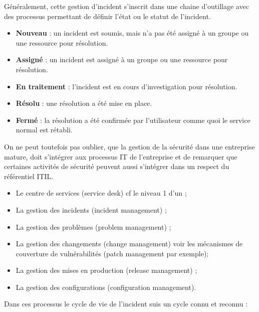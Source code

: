 Généralement, cette gestion d'incident s'inscrit dans une chaine d'outillage avec des processus permettant de définir l'état ou le statut de l'incident.

\begin{itemize}
  \item \textbf{Nouveau} : un incident est soumis, mais n'a pas été assigné à un groupe ou une ressource pour résolution.
  \item \textbf{Assigné} : un incident est assigné à un groupe ou une ressource pour résolution.
  \item \textbf{En traitement }: l'incident est en cours d'investigation pour résolution.
  \item \textbf{Résolu} : une résolution a été mise en place.
  \item \textbf{Fermé} : la résolution a été confirmée par l'utilisateur comme quoi le service normal est rétabli.
\end{itemize}

On ne peut toutefois pas oublier, que la gestion de la sécurité dans une entreprise mature, doit s'intégrer aux processus IT de l'entreprise et de remarquer que certaines activités de sécurité peuvent aussi s'intégrer dans un respect du référentiel ITIL.

\begin{itemize}
  \item Le centre de services (service desk) cf le niveau 1 d'un ;
  \item La gestion des incidents (incident management) ;
  \item La gestion des problèmes (problem management) ;
  \item La gestion des changements (change management) voir  les mécanismes de couverture de vulnérabilités (patch management par exemple);
  \item La gestion des mises en production (release management) ;
  \item La gestion des configurations (configuration management).
\end{itemize}

Dans ces processus le cycle de vie de l'incident suis un cycle connu et reconnu : 

